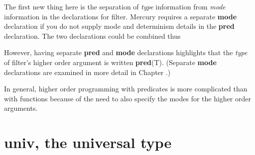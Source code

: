 \documentclass[a4paper,11pt,notitlepage,onecolumn]{book}
\begin{document}
The first new thing here is the separation of \emph{type}
information from \emph{mode} information in the declarations for \textsf{filter}.
Mercury requires a separate \textsf{\textbf{mode}} declaration if you do not supply mode and
determinism details in the \textsf{\textbf{pred}} declaration.
The two declarations could be combined thus
\begin{small}

\begin{ptabular}
\nextline
{}
\nextline
\end{ptabular}

\end{small}
However, having separate \textsf{\textbf{pred}} and \textsf{\textbf{mode}} declarations 
highlights that the \emph{type} of \textsf{filter}'s higher order argument
is written \textsf{\textbf{pred}(T)}.  (Separate \textsf{\textbf{mode}} declarations are examined in more
detail in Chapter \XXX{}.)  

In general, higher order programming with predicates is more complicated
than with functions because of the need to also specify the modes for the
higher order arguments.



\section{\textsf{univ}, the universal type}
\end{document}
